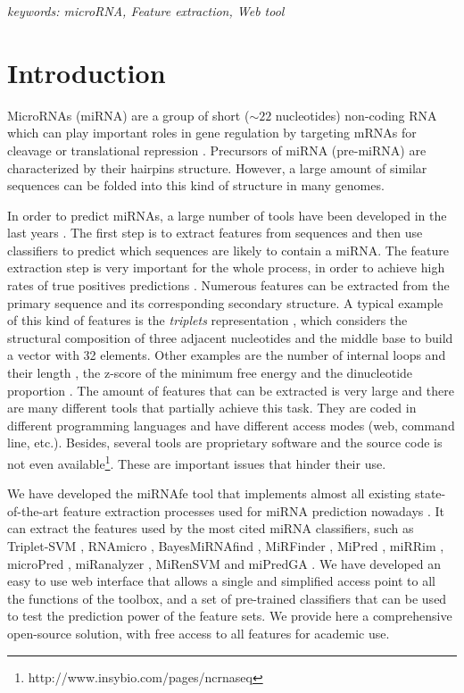 \documentclass{article}
\begin{document}
\textit{keywords: microRNA, Feature extraction, Web tool}


\section{Introduction}
MicroRNAs (miRNA) are a group of short ($\sim22$ nucleotides) non-coding RNA which can play important roles in gene regulation by targeting mRNAs for cleavage
or translational repression \citep{Lamers14}. Precursors of miRNA (pre-miRNA) are characterized by their hairpins structure. However, a large amount of similar
sequences can be folded into this kind of structure in many genomes.

In order to predict miRNAs, a large number of tools have been developed in the last years \citep{Kleftogiannis13}. The first step is to extract features from
sequences and then use classifiers to predict which sequences are likely to contain a miRNA. The feature extraction step is very important for the whole
process, in order to achieve high rates of true positives predictions \citep{Zhang10}.
Numerous features can be extracted from the primary sequence and its corresponding secondary structure. A typical example of this kind of features is the
\textit{triplets} representation \citep{Xue05}, which considers the structural composition of three adjacent nucleotides and the middle base to build a vector
with 32 elements. Other examples are the number of internal loops and their length \citep{Yousef06}, the z-score of the minimum free energy \citep{Hertel06}
and the dinucleotide proportion \citep{Rukshan09}. The amount of features that can be extracted is very large and there are many different tools that partially
achieve this task. They are coded in different programming languages and have different access modes (web, command line, etc.). Besides, several tools are
proprietary software and the source code is not even available\footnote{http://www.insybio.com/pages/ncrnaseq}. These are important issues that hinder their
use.

We have developed the miRNAfe tool that implements almost all existing state-of-the-art feature extraction processes used for miRNA prediction nowadays
\citep{Li10}. It can extract the features used by the most cited miRNA classifiers, such as Triplet-SVM \citep{Xue05}, RNAmicro \citep{Hertel06},
BayesMiRNAfind \citep{Yousef06}, MiRFinder \citep{Huang07}, MiPred \citep{Jiang07}, miRRim \citep{Goro07}, microPred \citep{Rukshan09}, miRanalyzer
\citep{Hackenberg09}, MiRenSVM \citep{Jiandong10} and miPredGA \citep{Xuan11}. We have developed an easy to use web interface that allows a single and
simplified access point to all the functions of the toolbox, and a set of pre-trained classifiers that can be used to test the prediction power of the feature
sets. We provide here a comprehensive open-source solution, with free access to all features for academic use.
\end{document}
